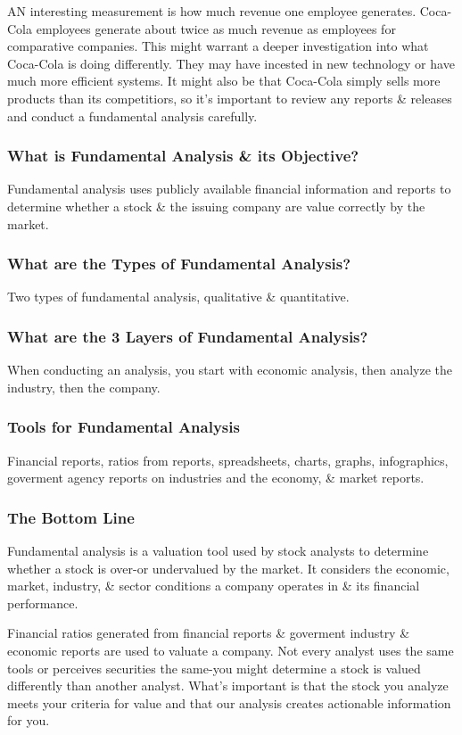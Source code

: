 \documentclass{article}
\begin{document}
	AN interesting measurement is how much revenue one employee generates. Coca-Cola employees generate about twice as much revenue as employees for comparative companies. This might warrant a deeper 
	investigation into what Coca-Cola is doing differently. They may have incested in new technology or have much more efficient systems. It might also be that Coca-Cola simply sells more products than 
	its competitiors, so it's important to review any reports \& releases and conduct a fundamental analysis carefully. \newline \newline

	\subsubsection{What is Fundamental Analysis \& its Objective?}
	Fundamental analysis uses publicly available financial information and reports to determine whether a stock \& the issuing company are value correctly by the market. \newline

	\subsubsection{What are the Types of Fundamental Analysis?}
	Two types of fundamental analysis, qualitative \& quantitative.

	\subsubsection{What are the 3 Layers of Fundamental Analysis?}
	When conducting an analysis, you start with economic analysis, then analyze the industry, then the company. \newline

	\subsubsection{Tools for Fundamental Analysis}
	Financial reports, ratios from reports, spreadsheets, charts, graphs, infographics, goverment agency reports on industries and the economy, \& market reports. \newline

	\subsubsection{The Bottom Line}
	Fundamental analysis is a valuation tool used by stock analysts to determine whether a stock is over-or undervalued by the market. It considers the economic, market, industry, \& sector conditions
	a company operates in \& its financial performance. \newline

	Financial ratios generated from financial reports \& goverment industry \& economic reports are used to valuate a company. Not every analyst uses the same tools or perceives securities the same-you
	might determine a stock is valued differently than another analyst. What's important is that the stock you analyze meets your criteria for value and that our analysis creates actionable information
	for you.
\end{document}
